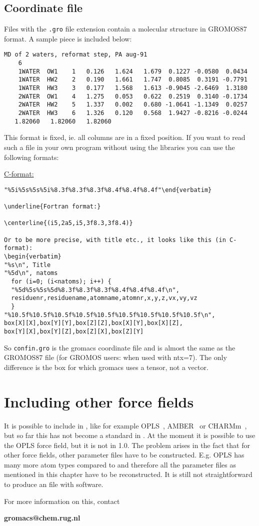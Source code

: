 \subsection{Coordinate file}
\label{subsec:grofile}
Files with the {\tt .gro} file extension contain a molecular structure in 
GROMOS87 format. A sample piece is included below:
\begin{verbatim}
MD of 2 waters, reformat step, PA aug-91
    6
    1WATER  OW1    1   0.126   1.624   1.679  0.1227 -0.0580  0.0434
    1WATER  HW2    2   0.190   1.661   1.747  0.8085  0.3191 -0.7791
    1WATER  HW3    3   0.177   1.568   1.613 -0.9045 -2.6469  1.3180
    2WATER  OW1    4   1.275   0.053   0.622  0.2519  0.3140 -0.1734
    2WATER  HW2    5   1.337   0.002   0.680 -1.0641 -1.1349  0.0257
    2WATER  HW3    6   1.326   0.120   0.568  1.9427 -0.8216 -0.0244
   1.82060   1.82060   1.82060
\end{verbatim}
This format is fixed, ie. all columns are in a fixed position. If you
want to read such a file in your own program without using the
{\gromacs} libraries you can use the following formats:

\underline{C-format:}
\begin{verbatim}"%5i%5s%5s%5i%8.3f%8.3f%8.3f%8.4f%8.4f%8.4f"\end{verbatim}

\underline{Fortran format:} 

\centerline{(i5,2a5,i5,3f8.3,3f8.4)}

Or to be more precise, with title etc., it looks like this (in C-format):
\begin{verbatim}
"%s\n", Title
"%5d\n", natoms
  for (i=0; (i<natoms); i++) {
  "%5d%5s%5s%5d%8.3f%8.3f%8.3f%8.4f%8.4f%8.4f\n",
  residuenr,residuename,atomname,atomnr,x,y,z,vx,vy,vz
  }
"%10.5f%10.5f%10.5f%10.5f%10.5f%10.5f%10.5f%10.5f%10.5f\n",
box[X][X],box[Y][Y],box[Z][Z],box[X][Y],box[X][Z],
box[Y][X],box[Y][Z],box[Z][X],box[Z][Y]
\end{verbatim}

So \verb'confin.gro' is the gromacs coordinate file and is almost  the
same as the GROMOS87 file (for GROMOS users: when used with
ntx=7). The only difference is the box for which gromacs uses a
tensor, not a vector.

\section{Including other force fields}
\label{sec:otherff}
It is possible to include  
in {\gromacs}, like for
example OPLS~\cite{Jorgensen88}, AMBER~\cite{Weiner86} or 
CHARMm~\cite{BBrooks83},
but so far this has not become a standard in {\gromacs}. At the moment
it is possible to use the OPLS force field, but it is not in {\gromacs}
1.0. The problem arises in the fact that for other force fields, other
parameter files have to be constructed. E.g. OPLS has many more atom
types compared to {\gromacs} and therefore all the parameter files as
mentioned in this chapter have to be reconstructed. It is still not
straightforward to produce an  file with {\gromacs}
software. 

For more information on this, contact

{\bf gromacs@chem.rug.nl}


